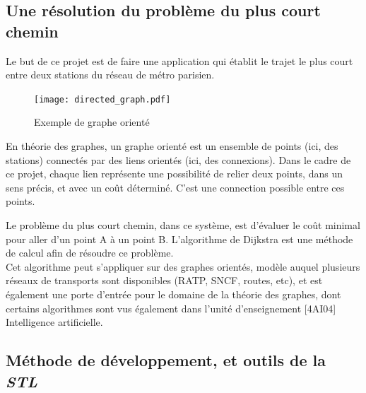 \documentclass[9pts]{article}
\begin{document}
\subsection{Une résolution du problème du plus court chemin}
Le but de ce projet est de faire une application qui établit le trajet le plus court entre deux stations du réseau de métro parisien.

\begin{figure}[h]
   \centering
   \texttt{[image: directed\_graph.pdf]}
   \caption{\label{directed_graph} Exemple de graphe orienté}
\end{figure}

En théorie des graphes, un graphe orienté est un ensemble de points (ici, des stations) connectés par des liens orientés (ici, des connexions). Dans le cadre de ce projet, chaque lien représente une possibilité de relier deux points, dans un sens précis, et avec un coût déterminé. C'est une connection possible entre ces points.

Le problème du plus court chemin, dans ce système, est d'évaluer le coût minimal pour aller d'un point A à un point B. L'algorithme de Dijkstra est une méthode de calcul afin de résoudre ce problème.\\

Cet algorithme peut s'appliquer sur des graphes orientés, modèle auquel plusieurs réseaux de transports sont disponibles (RATP, SNCF, routes, etc), et est également une porte d'entrée pour le domaine de la théorie des graphes, dont certains algorithmes sont vus également dans l'unité d'enseignement [4AI04] Intelligence artificielle.\\

\subsection{Méthode de développement, et outils de la \emph{STL}}
\end{document}
